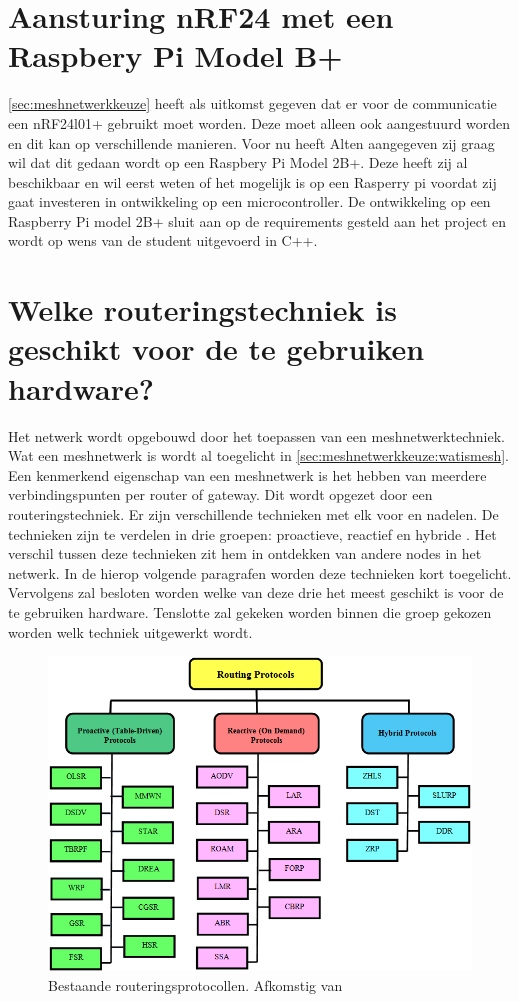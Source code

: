 \documentclass[a4paper, 11pt, oneside]{report}
\begin{document}
\section{Aansturing nRF24 met een Raspbery Pi Model B+}

\autoref{sec:meshnetwerkkeuze} heeft als uitkomst gegeven dat er voor de communicatie een nRF24l01+ gebruikt moet worden.
Deze moet alleen ook aangestuurd worden en dit kan op verschillende manieren.
Voor nu heeft Alten aangegeven zij graag wil dat dit gedaan wordt op een Raspbery Pi Model 2B+.
Deze heeft zij al beschikbaar en wil eerst weten of het mogelijk is op een Rasperry pi voordat zij gaat investeren in ontwikkeling op een microcontroller.
De ontwikkeling op een Raspberry Pi model 2B+ sluit aan op de requirements gesteld aan het project en wordt op wens van de student uitgevoerd in C++.


\section{Welke routeringstechniek is geschikt voor de te gebruiken hardware?}
\label{sec:meshnetwerktechniek}

Het netwerk wordt opgebouwd door het toepassen van een meshnetwerktechniek.
Wat een meshnetwerk is wordt al toegelicht in \autoref{sec:meshnetwerkkeuze:watismesh}.
Een kenmerkend eigenschap van een meshnetwerk is het hebben van meerdere verbindingspunten per router of gateway. Dit wordt opgezet door een routeringstechniek. Er zijn verschillende technieken met elk voor en nadelen. De technieken zijn te verdelen in drie groepen: proactieve, reactief en hybride \cite{meshprotocols}. Het verschil tussen deze technieken zit hem in ontdekken van andere nodes in het netwerk. In de hierop volgende paragrafen worden deze technieken kort toegelicht. Vervolgens zal besloten worden welke van deze drie het meest geschikt is voor de te gebruiken hardware. Tenslotte zal gekeken worden binnen die groep gekozen worden welk techniek uitgewerkt wordt.

\begin{figure}[H]
	\begin{center}\includegraphics[width=0.6\linewidth]{Afbeeldingen/meshprotocollen.png}\end{center}
	\caption{Bestaande routeringsprotocollen. Afkomstig van \protect\cite{meshprotocols}}
	\label{fig:meshprotcollen}
\end{figure}
\end{document}
